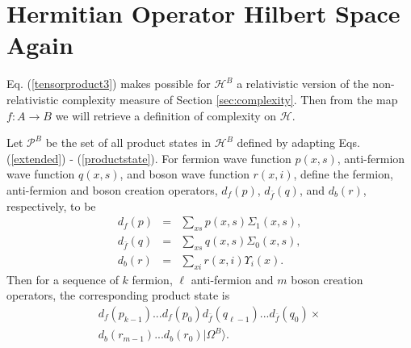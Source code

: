 \documentclass[twocolumn,amsmath,amssymb]{revtex4-1}
\begin{document}
\section{ \label{subsec:auxiliaryoperatorspace} Hermitian Operator Hilbert Space Again} 

Eq. (\ref{tensorproduct3}) makes possible for $\mathcal{H}^B$
a relativistic version of the 
non-relativistic complexity measure of Section \ref{sec:complexity}.
Then from the map $f:A \rightarrow B$ we will retrieve a definition
of complexity on $\mathcal{H}$.

Let $\mathcal{P}^B$ be the set of all product states in $\mathcal{H}^B$
defined by adapting Eqs. (\ref{extended}) - (\ref{productstate}).
For fermion wave function $p(x,s)$, anti-fermion wave function $q(x,s)$,
and boson wave function $r(x, i)$,
define the fermion, anti-fermion and boson creation operators, $d_f( p)$, $d_{\bar{f}}( q)$,
and $d_b( r)$, respectively, to be
\begin{subequations}
\begin{eqnarray}
\label{extendedf}
d_f( p) &=& \sum_{x s} p(x, s) \Sigma_1( x, s), \\
\label{extendedfbar}
d_{\bar{f}}( q) &=& \sum_{x s} q(x,s) \Sigma_0( x, s), \\
\label{extendedbi}
d_b( r) &=& \sum_{x i} r(x, i) \Upsilon_i( x).
\end{eqnarray}
\end{subequations}
Then for a sequence of 
$k$ fermion, $\ell$ anti-fermion and $m$ boson creation operators,
the corresponding product state is 
\begin{multline}
\label{productstater}
d_f( p_{k - 1}) ... d_f( p_0)
  d_{\bar{f}}( q_{\ell - 1}) ... d_{\bar{f}}( q_0) \times \\
  d_b( r_{m-1}) ... d_b( r_0) |\Omega^B \rangle .
\end{multline}
\end{document}

